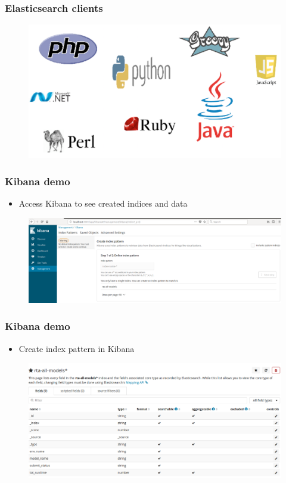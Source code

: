 \documentclass[11pt]{beamer}
\begin{document}
\begin{frame}
\frametitle{Elasticsearch clients}
\begin{figure}[h]
	\includegraphics[scale=.5]{images/es_clients}
\end{figure}
\end{frame}

\begin{frame}
\frametitle{Kibana demo}
\begin{itemize}
	\item Access Kibana to see created indices and data
\end{itemize}
\begin{figure}[h]
	\includegraphics[scale=.25]{images/kibana1}
\end{figure}
\end{frame}

\begin{frame}
\frametitle{Kibana demo}
\begin{itemize}
	\item Create index pattern in Kibana
\end{itemize}
\begin{figure}[h]
	\includegraphics[scale=.3]{images/kibana2}
\end{figure}
\end{frame}
\end{document}
